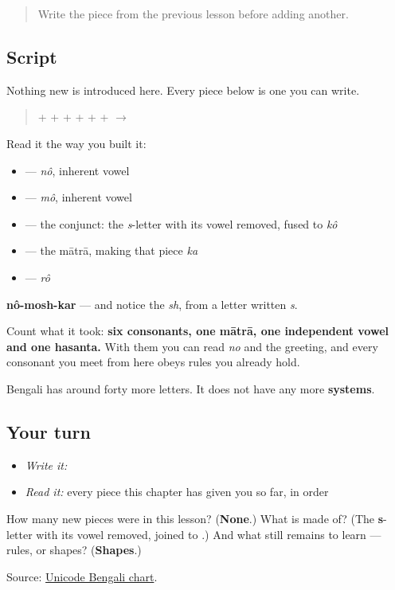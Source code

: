 \label{lesson:BN-W01-nomoshkar-read}



\begin{quote}
Write the piece from the previous lesson before adding another.
\end{quote}

\subsection*{Script}
Nothing new is introduced here. Every piece below is one you can write.

\begin{quote}
\textbf{} + \textbf{} + \textbf{} + \textbf{} + \textbf{} + \textbf{} + \textbf{} $\to$ \textbf{}
\end{quote}

Read it the way you built it:

\begin{itemize}
\raggedright
  \item \textbf{} — \emph{nô}, inherent vowel
  \item \textbf{} — \emph{mô}, inherent vowel
  \item \textbf{} — the conjunct: the \emph{s}-letter with its vowel removed, fused to \emph{kô}
  \item \textbf{} — the mātrā, making that piece \emph{ka}
  \item \textbf{} — \emph{rô}
\end{itemize}

\textbf{nô-mosh-kar} — and notice the \emph{sh}, from a letter written \emph{s}.

Count what it took: \textbf{six consonants, one mātrā, one independent vowel and one hasanta.} With them you can read \emph{no} and the greeting, and every consonant you meet from here obeys rules you already hold.

Bengali has around forty more letters. It does not have any more \textbf{systems}.

\subsection*{Your turn}
\begin{itemize}
\raggedright
  \item \emph{Write it:} 
  \item \emph{Read it:} every piece this chapter has given you so far, in order
\end{itemize}

\begin{tcolorbox}[breakable,colback=teal!4,colframe=teal!35!black,title={Before you move on}]
How many new pieces were in this lesson? (\textbf{None}.) What is \textbf{} made of? (The \textbf{s}-letter with its vowel removed, joined to \textbf{}.) And what still remains to learn — rules, or shapes? (\textbf{Shapes}.)

Source: \href{https://www.unicode.org/charts/PDF/U0980.pdf}{Unicode Bengali chart}.
\end{tcolorbox}
